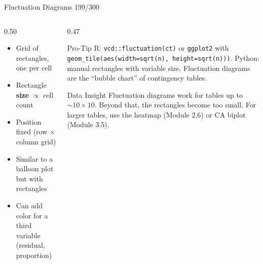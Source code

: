 \documentclass[10pt]{beamer}
\newcommand{\smark}[1]{\hfill{\scriptsize\color{codegray}#1}}
\begin{document}
\begin{frame}{Fluctuation Diagrams}
\smark{199/300}
\begin{columns}[T]
\begin{column}{0.50\textwidth}
\begin{itemize}
    \item Grid of rectangles, one per cell
    \item Rectangle \textbf{size} $\propto$ cell count
    \item Position fixed (row $\times$ column grid)
    \item Similar to a balloon plot but with rectangles
    \item Can add color for a third variable (residual, proportion)
\end{itemize}
\end{column}
\begin{column}{0.47\textwidth}
\begin{alertblock}{Pro-Tip}
    \scriptsize R: \texttt{vcd::fluctuation(ct)} or \texttt{ggplot2} with \texttt{geom\_tile(aes(width=sqrt(n), height=sqrt(n)))}. Python: manual rectangles with variable size. Fluctuation diagrams are the ``bubble chart'' of contingency tables.
\end{alertblock}
\vspace{0.1cm}
\begin{exampleblock}{Data Insight}
    \scriptsize Fluctuation diagrams work for tables up to $\sim 10 \times 10$. Beyond that, the rectangles become too small. For larger tables, use the heatmap (Module 2.6) or CA biplot (Module 3.5).
\end{exampleblock}
\end{column}
\end{columns}
\end{frame}
\end{document}
